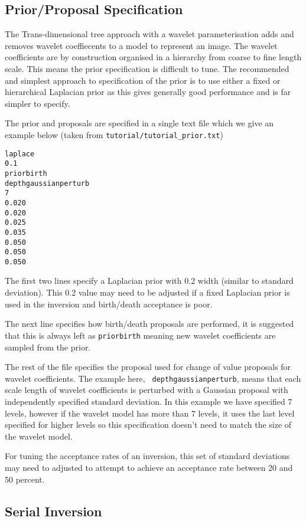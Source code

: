 \documentclass{article}
\begin{document}
\subsection{Prior/Proposal Specification}
The Trans-dimensional tree approach with a wavelet parameterisation adds and removes
wavelet coeffiecents to a model to represent an image. The wavelet coefficients are
by construction organised in a hierarchy from coarse to fine length scale. This
means the prior specification is difficult to tune. The recommended and simplest
approach to specification of the prior is to use either a fixed or hierarchical
Laplacian prior as this gives generally good performance and is far simpler to
specify.

The prior and proposals are specified in a single text file which we give
an example below (taken from {\tt tutorial/tutorial\_prior.txt})

\begin{verbatim}
laplace
0.1
priorbirth
depthgaussianperturb
7
0.020
0.020
0.025
0.035
0.050
0.050
0.050
\end{verbatim}

The first two lines specify a Laplacian prior with 0.2 width (similar to standard
deviation). This 0.2 value may need to be adjusted if a fixed Laplacian prior is
used in the inversion and birth/death acceptance is poor.

The next line specifies how birth/death proposals are performed, it is
suggested that this is always left as {\tt priorbirth} meaning new
wavelet coefficients are sampled from the prior.

The rest of the file specifies the proposal used for change of value
proposals for wavelet coefficients. The example here, {\tt
  depthgaussianperturb}, means that each scale length of wavelet
coefficients is perturbed with a Gaussian proposal with independently
specified standard deviation. In this example we have specified 7
levels, however if the wavelet model has more than 7 levels, it uses
the last level specified for higher levels so this specification
doesn't need to match the size of the wavelet model.

For tuning the acceptance rates of an inversion, this set of standard
deviations may need to adjusted to attempt to achieve an acceptance
rate between 20 and 50 percent. 

\subsection{Serial Inversion}
\end{document}
